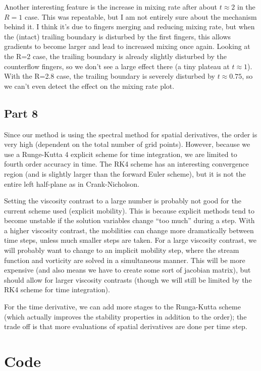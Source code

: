 \documentclass{article}
\begin{document}
Another interesting feature is the increase in mixing rate after about $t \approx 2$ in the $R=1$ case.
This was repeatable, but I am not entirely sure about the mechanism behind it.
I think it's due to fingers merging and reducing mixing rate, but when the (intact) trailing boundary is disturbed by the first fingers, this allows gradients to become larger and lead to increased mixing once again.
Looking at the R=2 case, the trailing boundary is already slightly disturbed by the counterflow fingers, so we don't see a large effect there (a tiny plateau at $t \approx 1$).
With the R=2.8 case, the trailing boundary is severely disturbed by $t \approx 0.75$, so we can't even detect the effect on the mixing rate plot.


\subsection{Part 8}
Since our method is using the spectral method for spatial derivatives, the order is very high (dependent on the total number of grid points).
However, because we use a Runge-Kutta 4 explicit scheme for time integration, we are limited to fourth order accuracy in time.
The RK4 scheme has an interesting convergence region (and is slightly larger than the forward Euler scheme), but it is not the entire left half-plane as in Crank-Nicholson.

Setting the viscosity contrast to a large number is probably not good for the current scheme used (explicit mobility).
This is because explicit methods tend to become unstable if the solution variables change ``too much'' during a step.
With a higher viscosity contrast, the mobilities can change more dramatically between time steps, unless much smaller steps are taken.
For a large viscosity contrast, we will probably want to change to an implicit mobility step, where the stream function and vorticity are solved in a simultaneous manner.
This will be more expensive (and also means we have to create some sort of jacobian matrix), but should allow for larger viscosity contrasts (though we will still be limited by the RK4 scheme for time integration).

For the time derivative, we can add more stages to the Runga-Kutta scheme (which actually improves the stability properties in addition to the order); the trade off is that more evaluations of spatial derivatives are done per time step.

\clearpage
\appendix
\section{Code}





\end{document}
